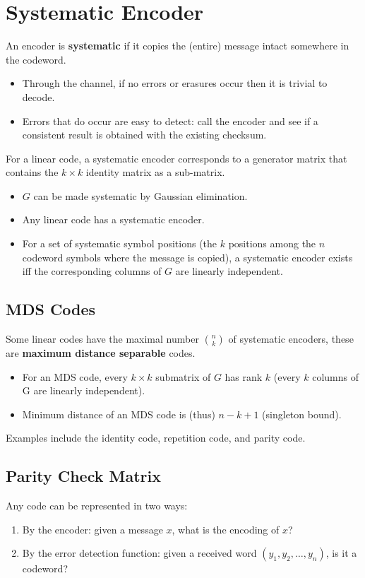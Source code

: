 \documentclass[11pt]{article}
\begin{document}
\section{Systematic Encoder}
An encoder is \textbf{systematic} if it copies the (entire) message intact somewhere in the codeword.
\begin{itemize}
  \item Through the channel, if no errors or erasures occur then it is trivial to decode.
  \item Errors that do occur are easy to detect: call the encoder and see if a consistent result is obtained with the existing checksum.
\end{itemize}

For a linear code, a systematic encoder corresponds to a generator matrix that contains the $k \times k$ identity matrix as a sub-matrix.
\begin{itemize}
  \item $G$ can be made systematic by Gaussian elimination.
  \item Any linear code has a systematic encoder.
  \item For a set of systematic symbol positions (the $k$ positions among the $n$ codeword symbols where the message is copied), a systematic encoder exists iff the corresponding columns of $G$ are linearly independent.
\end{itemize}

\subsection{MDS Codes}
Some linear codes have the maximal number $\binom{n}{k}$ of systematic encoders, these are \textbf{maximum distance separable} codes.
\begin{itemize}
  \item For an MDS code, every $k \times k$ submatrix of $G$ has rank $k$ (every $k$ columns of G are linearly independent).
  \item Minimum distance of an MDS code is (thus) $n - k + 1$ (singleton bound).
\end{itemize}

Examples include the identity code, repetition code, and parity code.

\subsection{Parity Check Matrix}
Any code can be represented in two ways:
\begin{enumerate}
  \item By the encoder: given a message $x$, what is the encoding of $x$?
  \item By the error detection function: given a received word $(y_1, y_2, \ldots, y_n)$, is it a codeword?
\end{enumerate}
\end{document}
